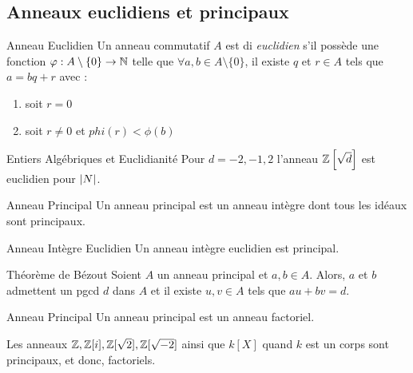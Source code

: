 \documentclass{cours}
\begin{document}
\subsection{Anneaux euclidiens et principaux}
\begin{définition}{Anneau Euclidien}{}
    Un anneau commutatif $A$ est di \emph{euclidien} s'il possède une fonction $\varphi : A\setminus \{0\} \to \mathbb{N}$ telle que $\forall a, b \in A \setminus \{0\}$, il existe $q$ et $r \in A$ tels que $a = bq + r$ avec :
    \begin{enumerate}
        \item soit $r = 0$
        \item soit $r \neq 0$ et $phi(r) < \phi(b)$
    \end{enumerate}
\end{définition}

\begin{propositionfr}{Entiers Algébriques et Euclidianité}{}
    Pour $d = -2, -1, 2$ l'anneau $\mathbb{Z}\left[\sqrt{d}\right]$ est euclidien pour $\left|N\right|$.
\end{propositionfr}

\begin{définition}{Anneau Principal}{}
    Un anneau principal est un anneau intègre dont tous les idéaux sont principaux.
\end{définition}

\begin{propositionfr}{Anneau Intègre Euclidien}{}
    Un anneau intègre euclidien est principal.
\end{propositionfr}

\begin{propositionfr}{Théorème de Bézout}{}
    Soient $A$ un anneau principal et $a, b \in A$. Alors, $a$ et $b$ admettent un pgcd $d$ dans $A$ et il existe $u, v \in A$ tels que $au + bv = d$.
\end{propositionfr}

\begin{théorème}{Anneau Principal}{}
    Un anneau principal est un anneau factoriel.
\end{théorème}

\begin{corollaire}{}{}
    Les anneaux $\mathbb{Z}, \mathbb{Z}[i], \mathbb{Z}[\sqrt{2}], \mathbb{Z}[\sqrt{-2}]$ ainsi que $k[X]$ quand $k$ est un corps sont principaux, et donc, factoriels.
\end{corollaire}
\end{document}

